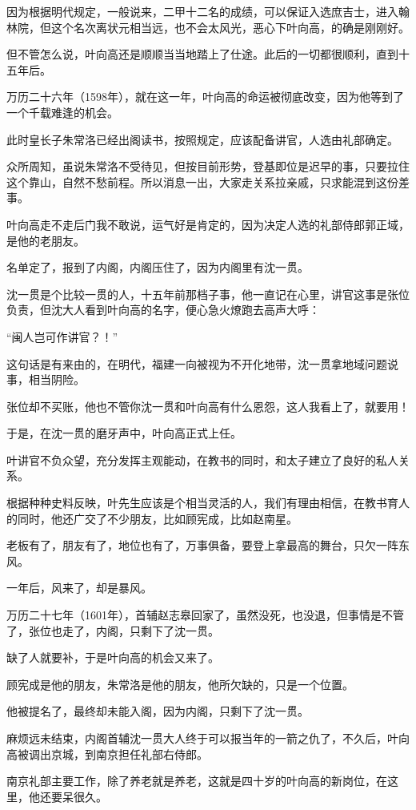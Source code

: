 \begin{multicols}{\theparacolNo}
因为根据明代规定，一般说来，二甲十二名的成绩，可以保证入选庶吉士，进入翰林院，但这个名次离状元相当远，也不会太风光，恶心下叶向高，的确是刚刚好。

但不管怎么说，叶向高还是顺顺当当地踏上了仕途。此后的一切都很顺利，直到十五年后。

万历二十六年（1598年），就在这一年，叶向高的命运被彻底改变，因为他等到了一个千载难逢的机会。

此时皇长子朱常洛已经出阁读书，按照规定，应该配备讲官，人选由礼部确定。

众所周知，虽说朱常洛不受待见，但按目前形势，登基即位是迟早的事，只要拉住这个靠山，自然不愁前程。所以消息一出，大家走关系拉亲戚，只求能混到这份差事。

叶向高走不走后门我不敢说，运气好是肯定的，因为决定人选的礼部侍郎郭正域，是他的老朋友。

名单定了，报到了内阁，内阁压住了，因为内阁里有沈一贯。

沈一贯是个比较一贯的人，十五年前那档子事，他一直记在心里，讲官这事是张位负责，但沈大人看到叶向高的名字，便心急火燎跑去高声大呼：

“闽人岂可作讲官？！”

这句话是有来由的，在明代，福建一向被视为不开化地带，沈一贯拿地域问题说事，相当阴险。

张位却不买账，他也不管你沈一贯和叶向高有什么恩怨，这人我看上了，就要用！

于是，在沈一贯的磨牙声中，叶向高正式上任。

叶讲官不负众望，充分发挥主观能动，在教书的同时，和太子建立了良好的私人关系。

根据种种史料反映，叶先生应该是个相当灵活的人，我们有理由相信，在教书育人的同时，他还广交了不少朋友，比如顾宪成，比如赵南星。

老板有了，朋友有了，地位也有了，万事俱备，要登上拿最高的舞台，只欠一阵东风。

一年后，风来了，却是暴风。

万历二十七年（1601年），首辅赵志皋回家了，虽然没死，也没退，但事情是不管了，张位也走了，内阁，只剩下了沈一贯。

缺了人就要补，于是叶向高的机会又来了。

顾宪成是他的朋友，朱常洛是他的朋友，他所欠缺的，只是一个位置。

他被提名了，最终却未能入阁，因为内阁，只剩下了沈一贯。

麻烦远未结束，内阁首辅沈一贯大人终于可以报当年的一箭之仇了，不久后，叶向高被调出京城，到南京担任礼部右侍郎。

南京礼部主要工作，除了养老就是养老，这就是四十岁的叶向高的新岗位，在这里，他还要呆很久。


\end{multicols}
